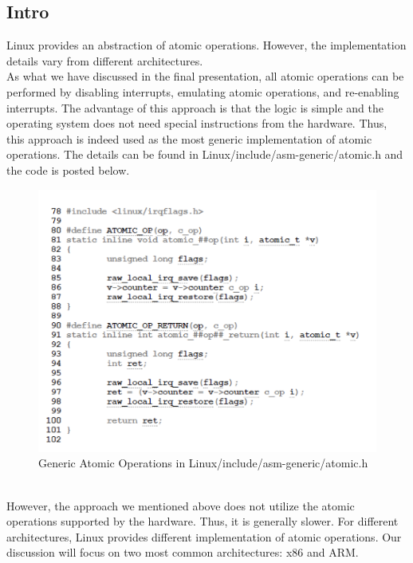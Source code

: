 \documentclass[10pt]{sigplanconf}
\begin{document}
\subsection{Intro}
Linux provides an abstraction of atomic operations. However, the implementation details vary from different architectures.\\
As what we have discussed in the final presentation, all atomic operations can be performed by disabling interrupts, emulating atomic operations, and re-enabling interrupts. The advantage of this approach is that the logic is simple and the operating system does not need special instructions from the hardware. Thus, this approach is indeed used as the most generic implementation of atomic operations. The details can be found in Linux/include/asm-generic/atomic.h and the code is posted below.\\
\begin{figure}[h!]
  \centering
  \includegraphics[scale=0.5]{Linux_generic_atomic.png}
  \caption{Generic Atomic Operations in Linux/include/asm-generic/atomic.h}
  \label{fig:ec}
\end{figure}\\
However, the approach we mentioned above does not utilize the atomic operations supported by the hardware. Thus, it is generally slower. For different architectures, Linux provides different implementation of atomic operations. Our discussion will focus on two most common architectures: x86 and ARM.\\
\end{document}
